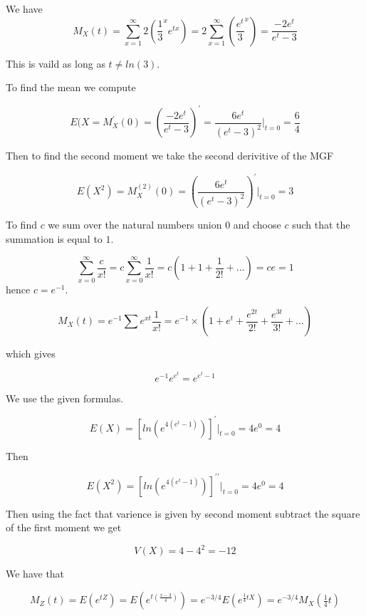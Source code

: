 \documentclass[11pt,largemargins]{homework}
\begin{document}
\maketitle

\question
We have 
\[M_X(t) = \sum_{x=1}^{\infty}2(\frac{1}{3}^xe^{tx}) = 2\sum_{x = 1}^{\infty} \left(\frac{e^t}{3}^x \right) = \frac{-2e^t}{e^t-3} \] 

This is vaild as long as $t \neq ln(3)$. 

To find the mean we compute 

\[E(X = M_X^\prime(0) = \left(\frac{-2e^t}{e^t - 3} \right)^\prime = \frac{6e^t}{(e^t - 3)^2}\big|_{t=0} = \frac{6}{4}\]

Then to find the second moment we take the second derivitive of the MGF

\[E(X^2) = M_X^{(2)}(0) = \left( \frac{6e^t}{(e^t - 3)^2} \right)^\prime\big|_{t=0} = 3  \]

\newpage

\question
\begin{alphaparts}
    \questionpart 
    To find $c$ we sum over the natural numbers union $0$ and choose $c$ such that the summation is equal to $1$. 

    \[\sum_{x = 0}^\infty \frac{c}{x!} = c\sum_{x = 0}^\infty \frac{1}{x!} = c(1 + 1 + \frac{1}{2!}+...) = ce = 1\]
    hence $c = e^{-1}$. 

    \questionpart 
    \[M_X(t) = e^{-1}\sum e^{xt}\frac{1}{x!} = e^{-1} \times (1 + e^t + \frac{e^{2t}}{2!} + \frac{e^{3t}}{3!}+...) \]

    which gives

    \[e^{-1} e^{e^t} = e^{e^t - 1}\]
    
\end{alphaparts}

\newpage 

\question 
We use the given formulas. 

\[E(X) = [ln(e^{4(e^t - 1)})]^\prime \big|_{t=0} = 4e^0 = 4\]

Then 

\[E(X^2) = [ln(e^{4(e^t - 1)})]^{\prime \prime}\big|_{t=0} = 4e^0 = 4\]

Then using the fact that varience is given by second moment subtract the square of the first moment we get 

\[V(X) = 4 - 4^2 = -12 \]

\newpage
We have that 

\[M_Z(t) =E(e^{tZ}) = E(e^{t(\tfrac{x - 3}{4})}) = e^{-3/4}E(e^{\tfrac{1}{4}tX}) =e^{-3/4}M_X(\tfrac{1}{4}t) \]
\end{document}

